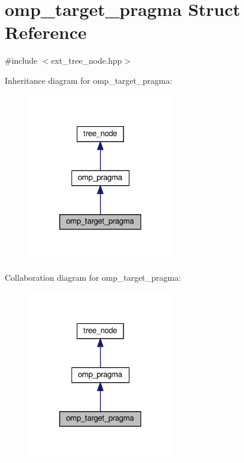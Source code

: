 \hypertarget{structomp__target__pragma}{}\section{omp\+\_\+target\+\_\+pragma Struct Reference}
\label{structomp__target__pragma}


{\ttfamily \#include $<$ext\+\_\+tree\+\_\+node.\+hpp$>$}



Inheritance diagram for omp\+\_\+target\+\_\+pragma\+:
\nopagebreak
\begin{figure}[H]
\begin{center}
\leavevmode
\includegraphics[width=183pt]{db/dc5/structomp__target__pragma__inherit__graph}
\end{center}
\end{figure}


Collaboration diagram for omp\+\_\+target\+\_\+pragma\+:
\nopagebreak
\begin{figure}[H]
\begin{center}
\leavevmode
\includegraphics[width=183pt]{d0/dcc/structomp__target__pragma__coll__graph}
\end{center}
\end{figure}
